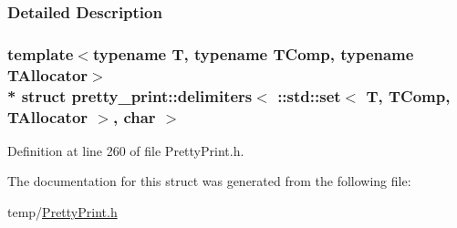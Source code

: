 \subsubsection{Detailed Description}
\subsubsection*{template$<$typename T, typename T\+Comp, typename T\+Allocator$>$\\*
struct pretty\+\_\+print\+::delimiters$<$ \+::std\+::set$<$ T, T\+Comp, T\+Allocator $>$, char $>$}



Definition at line 260 of file Pretty\+Print.\+h.



The documentation for this struct was generated from the following file\+:\begin{DoxyCompactItemize}
\item 
temp/\hyperlink{PrettyPrint_8h}{Pretty\+Print.\+h}\end{DoxyCompactItemize}
